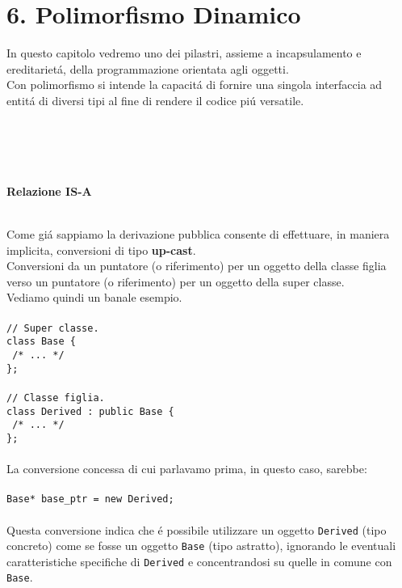 \documentclass{article}
\newcommand\tab[1][1cm]{\hspace*{#1}}
\begin{document}
\section*{\textcolor{blu}{6. Polimorfismo Dinamico}}
In questo capitolo vedremo uno dei pilastri, assieme a incapsulamento e ereditariet\'a, della programmazione orientata agli oggetti.\\Con polimorfismo si intende la capacit\'a di fornire una singola interfaccia ad entit\'a di diversi tipi al fine di rendere il codice pi\'u versatile.
\\ \\ \\ \\ \\
\begin{large}\textbf{\textcolor{blu}{Relazione IS-A}} \\ \\ \end{large}
Come gi\'a sappiamo la derivazione pubblica consente di effettuare, in maniera implicita, conversioni di tipo \textbf{up-cast}.\\Conversioni da un puntatore (o riferimento) per un oggetto della classe figlia verso un puntatore (o riferimento) per un oggetto della super classe.\\Vediamo quindi un banale esempio. \\ \\
\texttt{\textcolor{grigio}{// Super classe.} \\ class Base \{ \\ \tab \textcolor{grigio}{ /* ... */ } \\ \}; \\ \\ \textcolor{grigio}{// Classe figlia.} \\ class Derived : public Base \{ \\ \tab \textcolor{grigio}{ /* ... */ } \\ \};} \\ \\ 
La conversione concessa di cui parlavamo prima, in questo caso, sarebbe: \\ \\
\texttt{Base* base\_ptr = new Derived;} \\ \\
Questa conversione indica che \'e possibile utilizzare un oggetto \texttt{Derived} (tipo concreto) come se fosse un oggetto \texttt{Base} (tipo astratto), ignorando le eventuali caratteristiche specifiche di \texttt{Derived} e concentrandosi su quelle in comune con \texttt{Base}. \\ \\
\end{document}
